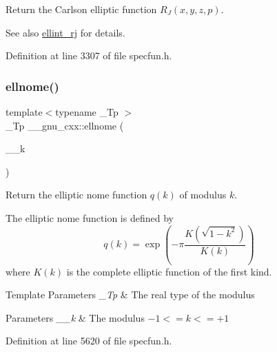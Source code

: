 Return the Carlson elliptic function $ R_J(x,y,z,p) $.

\begin{DoxySeeAlso}{See also}
\hyperlink{group__gnu__math__spec__func_gadccabc8df929cc03745286ed1574a3ba}{ellint\+\_\+rj} for details. 
\end{DoxySeeAlso}


Definition at line 3307 of file specfun.\+h.

\mbox{\label{group__gnu__math__spec__func_ga7bfb34f8b5c0ed7c72040f9cb7034bba}} 
\subsubsection{\texorpdfstring{ellnome()}{ellnome()}}
{\footnotesize\ttfamily template$<$typename \+\_\+\+Tp $>$ \\
\+\_\+\+Tp \+\_\+\+\_\+gnu\+\_\+cxx\+::ellnome (\begin{DoxyParamCaption}\item[{\+\_\+\+Tp}]{\+\_\+\+\_\+k }\end{DoxyParamCaption})\hspace{0.3cm}{\ttfamily [inline]}}

Return the elliptic nome function $ q(k) $ of modulus $ k $.

The elliptic nome function is defined by \[ q(k) = \exp \left(-\pi\frac{K(\sqrt{1-k^2})}{K(k)} \right) \] where $ K(k) $ is the complete elliptic function of the first kind.


\begin{DoxyTemplParams}{Template Parameters}
{\em \+\_\+\+Tp} & The real type of the modulus \\
\hline
\end{DoxyTemplParams}

\begin{DoxyParams}{Parameters}
{\em \+\_\+\+\_\+k} & The modulus $ -1 <= k <= +1 $ \\
\hline
\end{DoxyParams}


Definition at line 5620 of file specfun.\+h.

\mbox{\label{group__gnu__math__spec__func_gad3ba08e5843ea0ec2bb9ddde3033adff}} 
